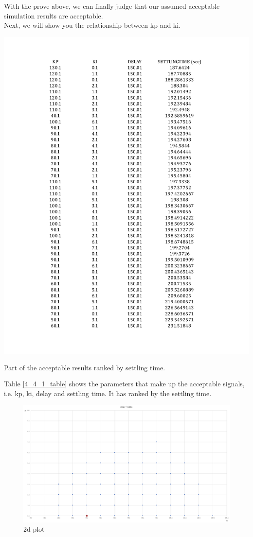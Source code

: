 \documentclass{report}
\begin{document}
With the prove above, we can finally judge that our assumed acceptable simulation results are acceptable.\\

Next, we will show you the relationship between kp and ki.\\

\begin{table}[htbp]
\centering
\includegraphics[width = \textwidth]{figure/4_4_1_table.pdf}
\caption{Part of the acceptable results ranked by settling time.}
\label{4_4_1_table}
\end{table}

 Table \textcolor{red}{\ref{4_4_1_table}} shows the parameters that make up the acceptable signals, i.e. kp, ki, delay and settling time. It has ranked by the settling time. \\

\begin{figure}[htbp]
\centering
\includegraphics[width = .819\textwidth]{figure/4_4_1_2d.png}
\caption{2d plot}
\label{4_4_1_2d}
\end{figure}
\end{document}
